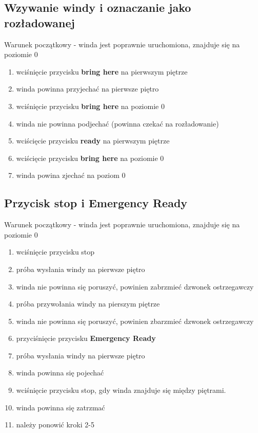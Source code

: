 \documentclass[a4paper,11pt]{article}
\begin{document}
	\subsection{Wzywanie windy i oznaczanie jako rozładowanej} 
		Warunek początkowy - winda jest poprawnie uruchomiona, znajduje się na poziomie 0
		\begin{enumerate}
			\item wciśnięcie przycisku \textbf{bring here} na pierwszym piętrze
			\item winda powinna przyjechać na pierwsze piętro
			\item wciśnięcie przycisku \textbf{bring here} na poziomie 0
			\item winda nie powinna podjechać (powinna czekać na rozładowanie)
			\item wciścięcie przycisku \textbf{ready} na pierwszym piętrze
			\item wciścięcie przycisku \textbf{bring here} na poziomie 0
			\item winda powina zjechać na poziom 0
		\end{enumerate}
		
	\subsection{Przycisk stop i Emergency Ready}
		Warunek początkowy - winda jest poprawnie uruchomiona, znajduje się na poziomie 0
		\begin{enumerate}
			\item wciśnięcie przycisku stop
			\item próba wysłania windy na pierwsze piętro
			\item winda nie powinna się poruszyć, powinien zabrzmieć dzwonek ostrzegawczy
			\item próba przywołania windy na pierszym piętrze 
			\item winda nie powinna się poruszyć, powinien zbarzmieć dzwonek ostrzegawczy
			\item przyciśnięcie przycisku \textbf{Emergency Ready}
			\item próba wysłania windy na pierwsze piętro
			\item winda powinna się pojechać
			\item wciśnięcie przycisku stop, gdy winda znajduje się między piętrami.
			\item winda powinna się zatrzmać
			\item należy ponowić kroki 2-5
		\end{enumerate} 
		
\end{document}
